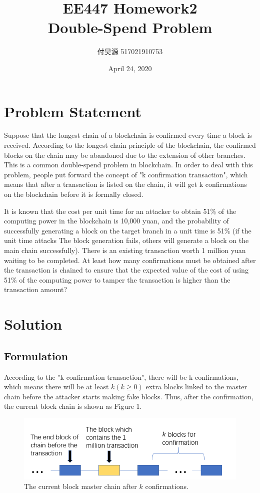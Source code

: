 \documentclass{article}
\title{\textbf{EE447 Homework2 \\ Double-Spend Problem}}
\author{付昊源 517021910753}
\date{April 24, 2020}
\begin{document}
\maketitle

\section*{Problem Statement}
Suppose that the longest chain of a blockchain is confirmed every time a block is received. According to the longest chain principle of the blockchain, the confirmed blocks on the chain may be abandoned due to the extension of other branches. This is a common double-spend problem in blockchain. In order to deal with this problem, people put forward the concept of "k confirmation transaction", which means that after a transaction is listed on the chain, it will get k confirmations on the blockchain before it is formally closed.

It is known that the cost per unit time for an attacker to obtain 51\% of the computing power in the blockchain is 10,000 yuan, and the probability of successfully generating a block on the target branch in a unit time is 51\% (if the unit time attacks The block generation fails, others will generate a block on the main chain successfully). There is an existing transaction worth 1 million yuan waiting to be completed. At least how many confirmations must be obtained after the transaction is chained to ensure that the expected value of the cost of using 51\% of the computing power to tamper the transaction is higher than the transaction amount?

\section*{Solution}
\subsection*{Formulation}
According to the "k confirmation transaction", there will be k confirmations, which means there will be at least $k(k\ge 0)$ extra blocks linked to the master chain before the attacker starts making fake blocks. Thus, after the confirmation, the current block chain is shown as Figure 1.
\begin{figure}[h]
    \centering
    \includegraphics[width=0.6\linewidth]{HW2_1.PNG}
    \caption{The current block master chain after $k$ confirmations.}
\end{figure}
\end{document}
